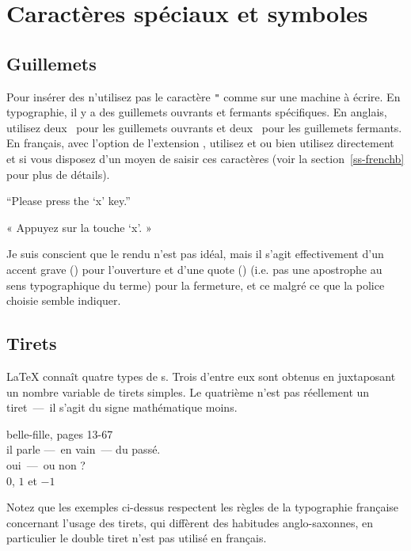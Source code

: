 \section{Caractères spéciaux et symboles}

\subsection{Guillemets}

Pour insérer des  n'utilisez pas le caractère \verb|"|
 comme sur une machine à écrire. En typographie,
il y a des guillemets ouvrants et fermants spécifiques. En anglais,
utilisez deux~\textasciigrave{} pour les guillemets ouvrants et
deux~\textquotesingle{}
pour les guillemets fermants.
En français, avec l'option  de l'extension ,
utilisez  et  ou bien utilisez directement
\texttt{\guillemotleft} et
\texttt{\guillemotright} si vous disposez d'un moyen de saisir ces caractères
(voir la section~\ref{ss-frenchb} pour plus de détails).
\begin{example}
``Please press the `x' key.''

« Appuyez sur la touche `x'. »
\end{example}
Je suis conscient que le rendu n'est pas idéal, mais il s'agit
effectivement d'un accent grave (\textasciigrave) pour l'ouverture et
d'une quote (\textquotesingle) (i.e. pas une apostrophe au sens
typographique du terme) pour la fermeture, et ce malgré ce que la
police choisie semble indiquer.

\subsection{Tirets}

\LaTeX{} connaît quatre types de s. Trois d'entre eux sont
obtenus en juxtaposant un nombre variable de tirets simples. Le
quatrième n'est  pas réellement un tiret~---~il s'agit du signe
mathématique moins. \index{-} \index{--} \index{---} 

\begin{example}
belle-fille, pages 13-67\\
il parle ---~en vain~---
du passé.\\
oui~---~ou non ? \\
$0$, $1$ et $-1$
\end{example}

Notez que les exemples ci-dessus respectent les règles de la
typographie française concernant l'usage des tirets, qui diffèrent
des habitudes anglo-saxonnes, en particulier le double tiret n'est pas
utilisé en français.

